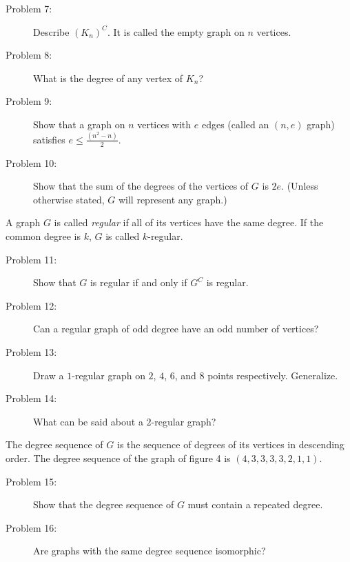\documentclass{article}
\begin{document}
\begin{description}

\item[Problem 7:] Describe $(K_n)^C$. It is called the empty graph on $n$ vertices.

\item[Problem 8:] What is the degree of any vertex of $K_n$?

\item[Problem 9:] Show that a graph on $n$ vertices with $e$ edges (called an $(n,e)$ graph) satisfies $e \leq \frac{(n^2-n)}{2}$.

\item[Problem 10:] Show that the sum of the degrees of the vertices of $G$ is $2e$. (Unless otherwise stated, $G$ will represent any graph.)

\end{description}

A graph $G$ is called \emph{regular} if all of its vertices have the same degree. If the common degree is $k$, $G$ is called $k$-regular.

\begin{description}

\item[Problem 11:] Show that $G$ is regular if and only if $G^C$ is regular.

\item[Problem 12:] Can a regular graph of odd degree have an odd number of vertices?

\item[Problem 13:] Draw a $1$-regular graph on $2$, $4$, $6$, and $8$ points respectively. Generalize.

\item[Problem 14:] What can be said about a $2$-regular graph?

\end{description}

The degree sequence of $G$ is the sequence of degrees of its vertices in descending order. The degree sequence of the graph of figure 4 is $(4,3,3,3,3,2,1,1)$.

\begin{description}

\item[Problem 15:] Show that the degree sequence of $G$ must contain a repeated degree.

\item[Problem 16:] Are graphs with the same degree sequence isomorphic?

\end{description}
\end{document}
